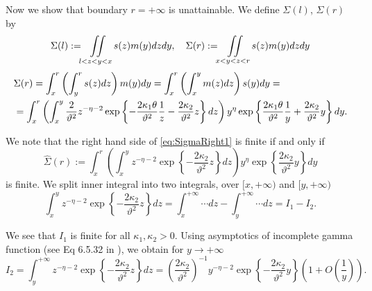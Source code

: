 \documentclass[pdftex,11pt,a4paper] {article}
\begin{document}
Now we show that boundary $r=+\infty$ is unattainable. We define $\Sigma(l)$, $\Sigma(r)$ by
\begin{equation}\label{eq:SigmaLeftRight}
\Sigma(l):=\iint\limits_{l<z<y<x}s(z)m(y)dzdy,\quad 
\Sigma(r):=\iint\limits_{x<y<z<r}s(z)m(y)dzdy\vspace*{-0.5\baselineskip}
\end{equation}\vspace*{-1.0\baselineskip}
\begin{equation}\label{eq:SigmaRight1}
\begin{split}
&\Sigma(r)=\int_x^r\left(\int_y^r s(z)dz\right)m(y)dy=
\int_x^r\left(\int_x^y m(z)dz\right)s(y)dy=\\
&=\int_x^r\left(\int_x^y \frac{2}{\vartheta^2}z^{-\eta-2}\exp\left\{-\frac{2\kappa_1\theta}{\vartheta^2}\frac{1}{z}-\frac{2\kappa_2}{\vartheta^2}z\right\}dz\right)y^\eta\exp\left\{\frac{2\kappa_1\theta}{\vartheta^2}\frac{1}{y}+\frac{2\kappa_2}{\vartheta^2}y\right\}dy.\vspace*{-1\baselineskip}
\end{split}
\end{equation}

We note that the right hand side of \eqref{eq:SigmaRight1} is finite if and only if\vspace*{-0.5\baselineskip}
\begin{equation}\label{eq:SigmaRight2}
\widehat\Sigma(r):=\int_x^r\left(\int_x^yz^{-\eta-2}\exp\left\{-\frac{2\kappa_2}{\vartheta^2}z\right\}dz\right)y^\eta\exp\left\{\frac{2\kappa_2}{\vartheta^2}y\right\}dy
\end{equation}
is finite. We split inner integral into two integrals, over $[x,+\infty)$ and $[y,+\infty)$
\begin{equation}\label{eq:SigmaRight3}
\int_x^yz^{-\eta-2}\exp\left\{-\frac{2\kappa_2}{\vartheta^2}z\right\}dz=
\int_x^{+\infty} \cdots dz-\int_y^{+\infty} \cdots dz=I_1-I_2.
\end{equation}

We see that $I_1$ is finite for all $\kappa_1, \kappa_2>0$. Using asymptotics of incomplete gamma function (see Eq 6.5.32 in \cite{AbramSteg}), we obtain for $y\to +\infty$
\begin{equation}\label{eq:SigmaRight4}
I_2=\int_y^{+\infty}z^{-\eta-2}\exp\left\{-\frac{2\kappa_2}{\vartheta^2}z\right\}dz=
\left(\frac{2\kappa_2}{\vartheta^2}\right)^{-1}y^{-\eta-2}\exp\left\{-\frac{2\kappa_2}{\vartheta^2}y\right\}\left(1+O\left(\frac{1}{y}\right)\right).
\end{equation}
\end{document}
